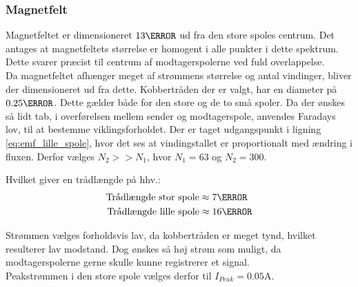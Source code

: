 \subsubsection{Magnetfelt}
Magnetfeltet er dimensioneret $13\mm$ ud fra den store spoles centrum.
Det antages at magnetfeltets størrelse er homogent i alle punkter i dette spektrum.
Dette svarer præcist til centrum af modtagerspolerne ved fuld overlappelse.\\
Da magnetfeltet afhænger meget af strømmens størrelse og antal vindinger, bliver der dimensioneret ud fra dette.
Kobbertråden der er valgt, har en diameter på $0.25\mm$.
Dette gælder både for den store og de to små spoler.
Da der ønskes så lidt tab, i overførelsen mellem sender og modtagerspole, anvendes Faradays lov, til at bestemme viklingsforholdet.
Der er taget udgangspunkt i ligning \ref{eq:emf_lille_spole}, hvor det ses at vindingstallet er proportionalt med ændring i fluxen.
Derfor vælges $N_2>>N_1$, hvor $N_1 = 63$ og $N_2 = 300$.

Hvilket giver en trådlængde på hhv.:
\begin{align}
	\text{Trådlængde stor spole} & \approx 7\m  \nonumber \\
	\text{Trådlængde lille spole} & \approx 16\m \nonumber
\end{align}

Strømmen vælges forholdsvis lav, da kobbertråden er meget tynd, hvilket resulterer lav modstand. 
Dog ønskes så høj strøm som muligt, da modtagerspolerne gerne skulle kunne registrerer et signal.\\
Peakstrømmen i den store spole vælges derfor til $I_{Peak} = 0.05\si{\ampere}$.

